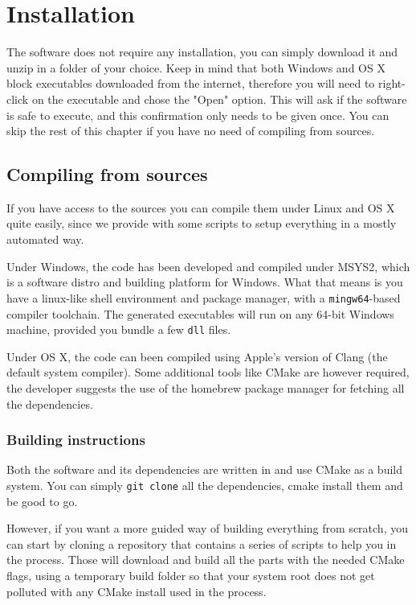 \chapter{Installation}
The software does not require any installation, you can simply download it
and unzip in a folder of your choice. Keep in mind that both Windows and OS X
block executables downloaded from the internet, therefore you will need to
right-click on the executable and chose the "Open" option. This will ask if
the software is safe to execute, and this confirmation only needs to be given once.
You can skip the rest of this chapter if you have no need of compiling from sources.

\section{Compiling from sources}

If you have access to the sources you can compile them under Linux and OS X
quite easily, since we provide with some scripts to setup everything
in a mostly automated way.

Under Windows, the code has been developed and compiled under MSYS2, which
is a software distro and building platform for Windows. What that means is
you have a linux-like shell environment and package manager, with a
\texttt{mingw64}-based compiler toolchain. The generated executables will run
on any 64-bit Windows machine, provided you bundle a few \texttt{dll} files.

Under OS X, the code can been compiled using Apple's version of Clang (the default system
compiler). Some additional tools like CMake are however required, the developer
suggests the use of the homebrew package manager for fetching all the dependencies.

\subsection{Building instructions}
Both the software and its dependencies are written in \CC{} and use CMake as a
build system. You can simply \texttt{git clone} all the dependencies, cmake install
them and be good to go.

However, if you want a more guided way of building everything from scratch,
you can start by cloning a repository that contains a series of scripts to help
you in the process. Those will download and build
all the parts with the needed CMake flags, using a temporary build folder
so that your system root does not get polluted with any CMake install used
in the process.

